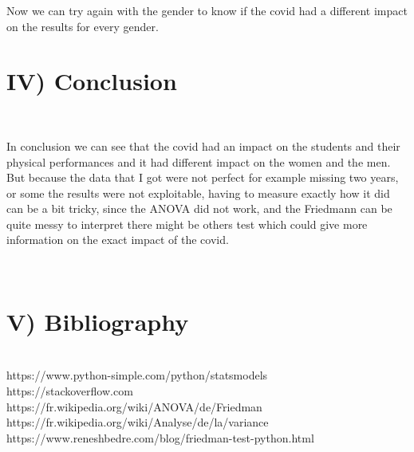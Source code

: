 \documentclass[
	12pt, %
]{fphw_assignment_toc}
\begin{document}
Now we can try again with the gender to know if the covid had a different impact on the results for every gender.


\newpage
\section{\large\bf IV) Conclusion~}
\\
\begin{problem}
In conclusion we can see that the covid had an impact on the students and their physical performances and it had different impact on the women and the men. But because the data that I got were not perfect for example missing two years, or some the results were not exploitable, having to measure exactly how it did can be a bit tricky, since the ANOVA did not work, and the Friedmann can be quite messy to interpret there might be others test which could give more information on the exact impact of the covid.
\end{problem}
\\

\newpage
\section{\large\bf V) Bibliography~}
\\
https://www.python-simple.com/python/statsmodels
\\

https://stackoverflow.com
\\

https://fr.wikipedia.org/wiki/ANOVA/de/Friedman
\\

https://fr.wikipedia.org/wiki/Analyse/de/la/variance
\\

https://www.reneshbedre.com/blog/friedman-test-python.html
\\
\end{document}
